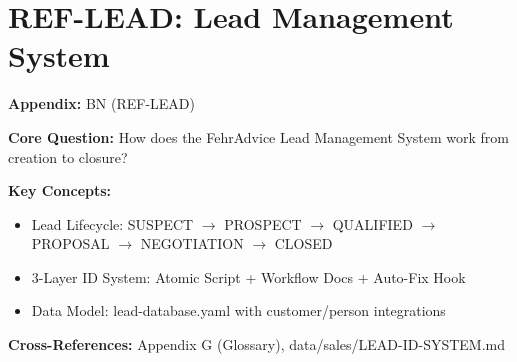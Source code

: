 \chapter{REF-LEAD: Lead Management System}
\label{app:lead-system}


\begin{tcolorbox}[colback=blue!5!white, colframe=blue!75!black,
    title=Quick Reference: Appendix BN]

\textbf{Appendix:} BN (REF-LEAD)

\textbf{Core Question:} How does the FehrAdvice Lead Management System work from creation to closure?

\textbf{Key Concepts:}
\begin{itemize}[nosep]
\item Lead Lifecycle: SUSPECT $\to$ PROSPECT $\to$ QUALIFIED $\to$ PROPOSAL $\to$ NEGOTIATION $\to$ CLOSED
\item 3-Layer ID System: Atomic Script + Workflow Docs + Auto-Fix Hook
\item Data Model: lead-database.yaml with customer/person integrations
\end{itemize}

\textbf{Cross-References:} Appendix G (Glossary), data/sales/LEAD-ID-SYSTEM.md
\end{tcolorbox}


\begin{abstract}
This appendix documents the complete FehrAdvice Lead Management System, providing operational guidance for the sales pipeline from lead identification through closure. It covers the 6-stage lifecycle model, the 3-layer ID prevention architecture that ensures data integrity, the YAML-based data model with cross-references to customer and person profiles, and the automated workflows including /lead-add and /meeting slash commands. The system integrates with Claude Code for automation while maintaining human oversight for strategic decisions.
\end{abstract}


